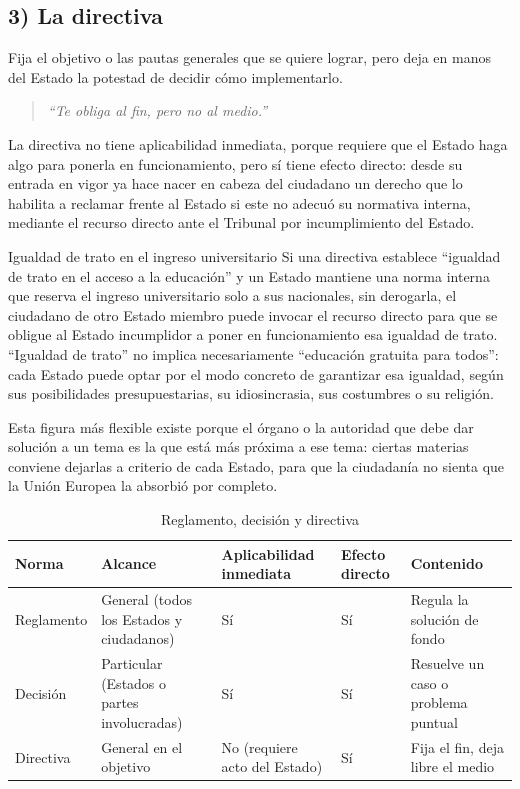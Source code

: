 \documentclass[12pt,oneside]{book}
\begin{document}
\subsection*{3) La directiva}

Fija el objetivo o las pautas generales que se quiere lograr, pero deja en manos del Estado la potestad de decidir cómo implementarlo.

\begin{quote}
\itshape ``Te obliga al fin, pero no al medio.''
\end{quote}

La directiva no tiene aplicabilidad inmediata, porque requiere que el Estado haga algo para ponerla en funcionamiento, pero sí tiene efecto directo: desde su entrada en vigor ya hace nacer en cabeza del ciudadano un derecho que lo habilita a reclamar frente al Estado si este no adecuó su normativa interna, mediante el recurso directo ante el Tribunal por incumplimiento del Estado.

\begin{example}{Igualdad de trato en el ingreso universitario}
Si una directiva establece ``igualdad de trato en el acceso a la educación'' y un Estado mantiene una norma interna que reserva el ingreso universitario solo a sus nacionales, sin derogarla, el ciudadano de otro Estado miembro puede invocar el recurso directo para que se obligue al Estado incumplidor a poner en funcionamiento esa igualdad de trato. ``Igualdad de trato'' no implica necesariamente ``educación gratuita para todos'': cada Estado puede optar por el modo concreto de garantizar esa igualdad, según sus posibilidades presupuestarias, su idiosincrasia, sus costumbres o su religión.
\end{example}

Esta figura más flexible existe porque el órgano o la autoridad que debe dar solución a un tema es la que está más próxima a ese tema: ciertas materias conviene dejarlas a criterio de cada Estado, para que la ciudadanía no sienta que la Unión Europea la absorbió por completo.

\begin{table}[H]
\centering
\caption{Reglamento, decisión y directiva}
\begin{tabularx}{\textwidth}{@{} l X X X X @{}}
\toprule
\textbf{Norma} & \textbf{Alcance} & \textbf{Aplicabilidad inmediata} & \textbf{Efecto directo} & \textbf{Contenido} \\
\midrule
Reglamento & General (todos los Estados y ciudadanos) & Sí & Sí & Regula la solución de fondo \\
Decisión & Particular (Estados o partes involucradas) & Sí & Sí & Resuelve un caso o problema puntual \\
Directiva & General en el objetivo & No (requiere acto del Estado) & Sí & Fija el fin, deja libre el medio \\
\bottomrule
\end{tabularx}
\end{table}
\end{document}
